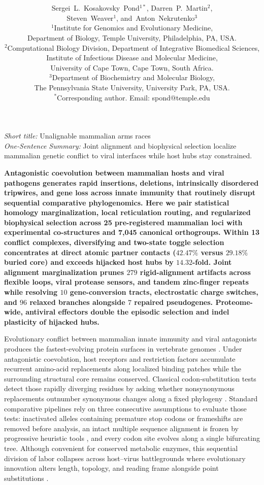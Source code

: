 \documentclass[12pt]{article}
\date{}
\title{\bfseries \boldmath \scititle}
\author{
	Sergei~L.~Kosakovsky~Pond$^{1\ast}$,
	Darren~P.~Martin$^{2}$,\\
	Steven~Weaver$^{1}$,
	and~Anton~Nekrutenko$^{3}$\\
	\small$^{1}$Institute for Genomics and Evolutionary Medicine,\\
	\small Department of Biology, Temple University, Philadelphia, PA, USA.\\
	\small$^{2}$Computational Biology Division, Department of Integrative Biomedical Sciences,\\
	\small Institute of Infectious Disease and Molecular Medicine,\\
	\small University of Cape Town, Cape Town, South Africa.\\
	\small$^{3}$Department of Biochemistry and Molecular Biology,\\
	\small The Pennsylvania State University, University Park, PA, USA.\\
	\small$^\ast$Corresponding author. Email: spond@temple.edu
}
\renewenvironment{abstract}
	{\quotation}
	{\endquotation}
\begin{document}
\maketitle

\noindent\textit{Short title:} Unalignable mammalian arms races\\[0.3em]
\noindent\textit{One-Sentence Summary:} Joint alignment and biophysical selection localize mammalian genetic conflict to viral interfaces while host hubs stay constrained.

\begin{abstract} \bfseries \boldmath
Antagonistic coevolution between mammalian hosts and viral pathogens generates rapid insertions, deletions, intrinsically disordered tripwires, and gene loss across innate immunity that routinely disrupt sequential comparative phylogenomics. Here we pair statistical homology marginalization, local reticulation routing, and regularized biophysical selection across 25 pre-registered mammalian loci with experimental co-structures and 7,045 canonical orthogroups. Within 13 conflict complexes, diversifying and two-state toggle selection concentrates at direct atomic partner contacts ($42.47\%$ versus $29.18\%$ buried core) and exceeds hijacked host hubs by $14.32$-fold. Joint alignment marginalization prunes $279$ rigid-alignment artifacts across flexible loops, viral protease sensors, and tandem zinc-finger repeats while resolving $10$ gene-conversion tracts, electrostatic charge switches, and $96$ relaxed branches alongside $7$ repaired pseudogenes. Proteome-wide, antiviral effectors double the episodic selection and indel plasticity of hijacked hubs.
\end{abstract}

\noindent
Evolutionary conflict between mammalian innate immunity and viral antagonists produces the fastest-evolving protein surfaces in vertebrate genomes \cite{daugherty2012rules,enard2016viruses}. Under antagonistic coevolution, host receptors and restriction factors accumulate recurrent amino-acid replacements along localized binding patches while the surrounding structural core remains conserved. Classical codon-substitution tests detect those rapidly diverging residues by asking whether nonsynonymous replacements outnumber synonymous changes along a fixed phylogeny \cite{goldman1994codon,muse1994likelihood,pond2005not,murrell2012detecting}. Standard comparative pipelines rely on three consecutive assumptions to evaluate those tests: inactivated alleles containing premature stop codons or frameshifts are removed before analysis, an intact multiple sequence alignment is frozen by progressive heuristic tools \cite{katoh2013mafft,loytynoja2008phylogeny}, and every codon site evolves along a single bifurcating tree. Although convenient for conserved metabolic enzymes, this sequential division of labor collapses across host--virus battlegrounds where evolutionary innovation alters length, topology, and reading frame alongside point substitutions \cite{fletcher2010indelible,jordan2012effects}.
\end{document}

